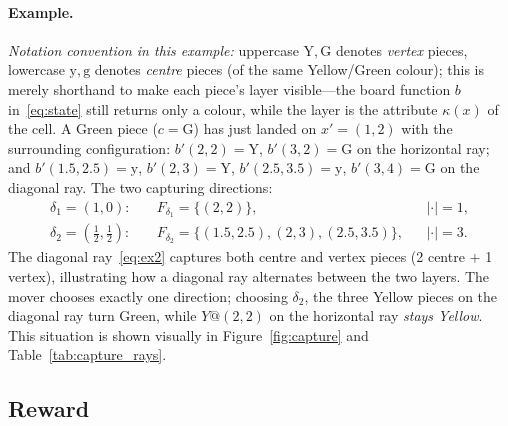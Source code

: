 \paragraph{Example.} \emph{Notation convention in this example:} uppercase
$\mathrm Y,\mathrm G$ denotes \emph{vertex} pieces, lowercase
$\mathrm y,\mathrm g$ denotes \emph{centre} pieces (of the same
Yellow/Green colour); this is merely shorthand to make each piece's layer
visible---the board function $b$ in~\eqref{eq:state} still returns only a
colour, while the layer is the attribute $\kappa(x)$ of the cell. A Green
piece ($c=\mathrm G$) has just landed on $x'=(1,2)$ with the surrounding
configuration: $b'(2,2)=\mathrm Y$, $b'(3,2)=\mathrm G$ on the horizontal
ray; and $b'(1.5,2.5)=\mathrm y$, $b'(2,3)=\mathrm Y$,
$b'(2.5,3.5)=\mathrm y$, $b'(3,4)=\mathrm G$ on the diagonal ray. The two
capturing directions:
\begin{align}
\delta_1=(1,0):\quad & F_{\delta_1}=\{(2,2)\}, && |{\cdot}|=1, \label{eq:ex1}\\
\delta_2=(\tfrac12,\tfrac12):\quad & F_{\delta_2}=\{(1.5,2.5),(2,3),(2.5,3.5)\}, && |{\cdot}|=3. \label{eq:ex2}
\end{align}
The diagonal ray~\eqref{eq:ex2} captures both centre and vertex pieces (2
centre $+$ 1 vertex), illustrating how a diagonal ray alternates between the
two layers. The mover chooses exactly one direction; choosing $\delta_2$,
the three Yellow pieces on the diagonal ray turn Green, while $Y@(2,2)$ on
the horizontal ray \emph{stays Yellow}. This situation is shown visually in
Figure~\ref{fig:capture} and Table~\ref{tab:capture_rays}.

\subsection{Reward}
\label{ssec:reward}

